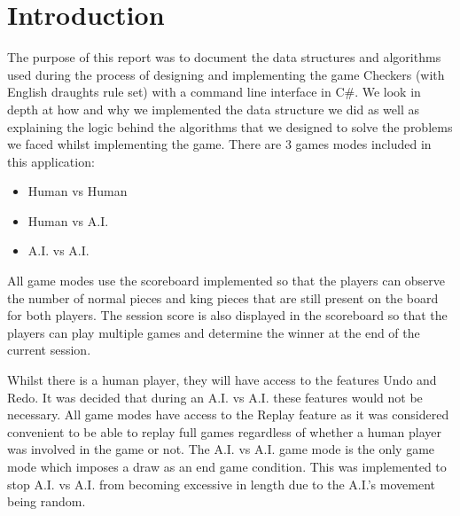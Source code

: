 \documentclass[10pt, a4paper]{article}
\title{\mytitle}
\author{\myauthor\hspace{1em}\\\contact\\Edinburgh Napier University\hspace{0.5em}-\hspace{0.5em}\mymodule}
\date{}
\begin{document}
	
\maketitle  
    
\begin{abstract}
\end{abstract}


    
    
    
\section{Introduction}
The purpose of this report was to document the data structures and algorithms used during the process of designing and implementing the game Checkers (with English draughts rule set) with a command line interface in C\#.
\newline
We look in depth at how and why we implemented the data structure we did as well as explaining the logic behind the algorithms that we designed to solve the problems we faced whilst implementing the game.
\newline
There are 3 games modes included in this application:

\begin{itemize}
	\item Human vs Human
	\item Human vs A.I.
	\item A.I. vs A.I.
\end{itemize}

All game modes use the scoreboard implemented so that the players can observe the number of normal pieces and king pieces that are still present on the board for both players. The session score is also displayed in the scoreboard so that the players can play multiple games and determine the winner at the end of the current session.

Whilst there is a human player, they will have access to the features Undo and Redo. It was decided that during an A.I. vs A.I. these features would not be necessary. All game modes have access to the Replay feature as it was considered convenient to be able to replay full games regardless of whether a human player was involved in the game or not.
\newline
The A.I. vs A.I. game mode is the only game mode which imposes a draw as an end game condition. This was implemented to stop A.I. vs A.I. from becoming excessive in length due to the A.I.'s movement being random.
\end{document}
